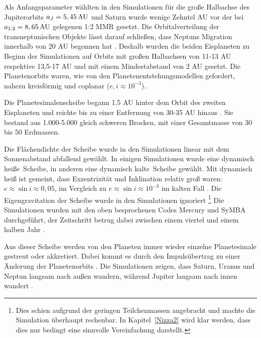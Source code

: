 \documentclass[12pt,a4paper,twoside,open=right,bibliography=totoc]{scrbook}
\renewcommand{\cite}{ \citep}
\begin{document}
Als Anfangsparameter wählten \cite{Tsiganis2005} in den Simulationen für die große Halbachse des Jupiterorbits $a_J = \unit[5,45]{AU}$ und Saturn wurde wenige Zehntel AU vor der bei $a_{1:2} = \unit[8,65]{AU}$ gelegenen 1:2 MMR gesetzt.
Die Orbitalverteilung der transneptunischen Objekte lässt darauf schließen, dass Neptuns Migration innerhalb von 20 AU begonnen hat\cite{Tsiganis2005}.
Deshalb wurden die beiden Eisplaneten zu Beginn der Simulationen auf Orbits mit großen Halbachsen von 11-13 AU respektive 13,5-17 AU und mit einem Mindestabstand von 2 AU gesetzt.
Die Planetenorbits waren, wie von den Planetenentstehungsmodellen gefordert, nahezu kreisförmig und coplanar ($e, i \approx 10^{-3}$).

Die Planetesimalenscheibe begann 1,5 AU hinter dem Orbit des zweiten Eisplaneten und reichte bis zu einer Entfernung von 30-35 AU hinaus\cite{Tsiganis2005,Levison2008}. Sie bestand aus 1.000-5.000 gleich schweren Brocken, mit einer Gesamtmasse von 30 bis 50 Erdmassen.

Die Flächendichte der Scheibe wurde in den Simulationen linear mit dem Sonnenabstand abfallend gewählt. In einigen Simulationen wurde eine \glqq dynamisch heiße\grqq\ Scheibe, in anderen eine \glqq dynamisch kalte\grqq\ Scheibe gewählt. Mit dynamisch heiß ist gemeint, dass Exzentrizität und Inklination relativ groß waren: $e \approx \sin i \approx 0,05 $, im Vergleich zu $e \approx \sin i \approx 10^{-3} $ im kalten Fall\cite{Tsiganis2005}.
Die Eigengravitation der Scheibe wurde in den Simulationen ignoriert\cite{Tsiganis2005}\footnote{Dies schien aufgrund der geringen Teilchenmassen angebracht und machte die Simulation überhaupt rechenbar. In Kapitel~\ref{Nizza2} wird klar werden, dass dies nur bedingt eine sinnvolle Vereinfachung darstellt.}
Die Simulationen wurden mit den oben besprochenen Codes Mercury und SyMBA durchgeführt,
der Zeitschritt betrug dabei zwischen einem viertel und einem halben Jahr\cite{Tsiganis2005}.

Aus dieser Scheibe werden von den Planeten immer wieder einzelne Planetesimale gestreut oder akkretiert. Dabei kommt es durch den Impulsübertrag zu einer Änderung der Planetenorbits\cite{Tsiganis2005}.
Die Simulationen zeigen, dass Saturn, Uranus und Neptun langsam nach außen wandern, während Jupiter langsam nach innen wandert\cite{Hahn1999,Tsiganis2005}.
\end{document}

